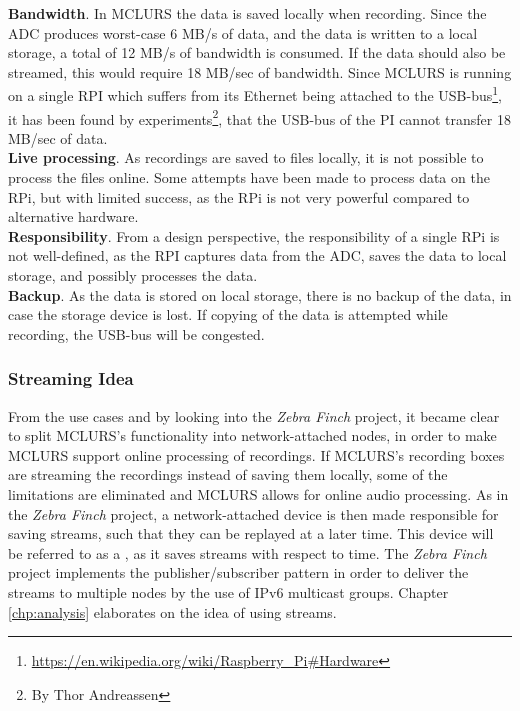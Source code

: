 \textbf{Bandwidth}. In MCLURS the data is saved locally when recording. Since the ADC produces worst-case 6 MB/s of data, and the data is written to a local storage, a total of 12 MB/s of bandwidth is consumed. If the data should also be streamed, this would require 18 MB/sec of bandwidth. Since MCLURS is running on a single RPI which suffers from its Ethernet being attached to the USB-bus\footnote{\url{https://en.wikipedia.org/wiki/Raspberry\_Pi\#Hardware}}, it has been found by experiments\footnote{By Thor Andreassen}, that the USB-bus of the PI cannot transfer 18 MB/sec of data.\\

\textbf{Live processing}. As recordings are saved to files locally, it is not possible to process the files online. Some attempts have been made to process data on the RPi, but with limited success, as the RPi is not very powerful compared to alternative hardware. \\

\textbf{Responsibility}. From a design perspective, the responsibility of a single RPi is not well-defined, as the RPI captures data from the ADC, saves the data to local storage, and possibly processes the data. \\

\textbf{Backup}. As the data is stored on local storage, there is no backup of the data, in case the storage device is lost. If copying of the data is attempted while recording, the USB-bus will be congested.

 
 
\subsubsection{Streaming Idea} \label{sec:streamingidea}
From the use cases and by looking into the \textit{Zebra Finch}\citep{larsen2016system} project, it became clear to split MCLURS's functionality into network-attached nodes, in order to make MCLURS support online processing of recordings. If MCLURS's recording boxes are streaming the recordings instead of saving them locally, some of the limitations are eliminated and MCLURS allows for online audio processing. As in the \textit{Zebra Finch} project, a network-attached device is then made responsible for saving streams, such that they can be replayed at a later time. This device will be referred to as a , as it saves streams with respect to time. The \textit{Zebra Finch} project implements the publisher/subscriber pattern in order to deliver the streams to multiple nodes by the use of IPv6 multicast groups. 
Chapter \ref{chp:analysis} elaborates on the idea of using streams.\\


